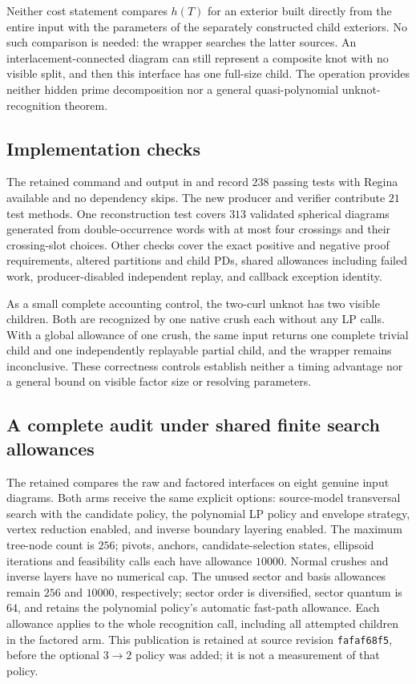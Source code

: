 Neither cost statement compares $h(T)$ for an exterior built directly from
the entire input with the parameters of the separately constructed child
exteriors.  No such comparison is needed: the wrapper searches the latter
sources.  An interlacement-connected diagram can still represent a composite
knot with no visible split, and then this interface has one full-size child.
The operation provides neither hidden prime decomposition nor a general
quasi-polynomial unknot-recognition theorem.

\subsection{Implementation checks}

The retained command and output in
 and
 record $238$ passing tests with
Regina available and no dependency skips.  The new producer and verifier
contribute $21$ test methods.  One reconstruction test covers $313$
validated spherical diagrams generated from double-occurrence words with
at most four crossings and their crossing-slot choices.  Other checks cover
the exact positive and negative proof requirements, altered partitions and
child PDs, shared allowances including failed work, producer-disabled
independent replay, and callback exception identity.

As a small complete accounting control, the two-curl unknot has two visible
children.  Both are recognized by one native crush each without any LP calls.
With a global allowance of one crush, the same input returns one complete
trivial child and one independently replayable partial child, and the wrapper
remains inconclusive.  These correctness controls establish neither a timing
advantage nor a general bound on visible factor size or resolving parameters.

\subsection{A complete audit under shared finite search allowances}
\label{sec:factored-crushing-audit}

The retained  compares the raw and
factored interfaces on eight genuine input diagrams.  Both arms receive
the same explicit options: source-model transversal search with the
 candidate policy, the polynomial LP policy and envelope
strategy, vertex reduction enabled, and inverse boundary layering enabled.
The maximum tree-node count is $256$; pivots, anchors, candidate-selection
states, ellipsoid iterations and feasibility calls each have allowance
$10000$.  Normal crushes and inverse layers have no numerical cap.
The unused sector and basis allowances remain $256$ and $10000$,
respectively; sector order is diversified, sector quantum is $64$, and
 retains the polynomial policy's automatic
fast-path allowance.  Each allowance applies to the whole recognition call,
including all attempted children in the factored arm.
This publication is retained at source revision \texttt{fafaf68f5}, before
the optional $3\to2$ policy was added; it is not a measurement of that policy.

